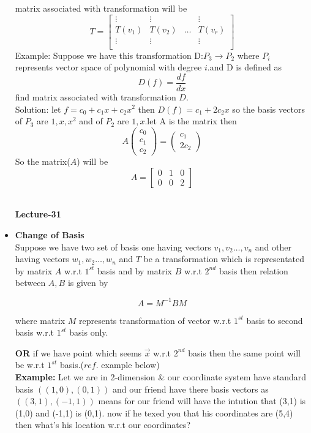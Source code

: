 \documentclass[a4paper,11pt]{article}
\numberwithin{equation}{section}
\begin{document}
\begin{itemize}
matrix associated with transformation will be 
\[T=
\begin{bmatrix}
    \vdots&\vdots&&\vdots\\
    T(v_1)&T(v_2)&\dots&T(v_r)\\
    \vdots&\vdots&&\vdots\\
\end{bmatrix}
\]
Example: Suppose we have this transformation D:$P_3\rightarrow P_2$ where $P_i$ represents vector space of polynomial with degree $i$.and D is defined as \[D(f)=\frac{df}{dx}\] find matrix associated with transformation $D$.\\
Solution: let $f=c_0+c_1x+c_2x^2$ then $D(f)=c_1+2c_2x$ so the basis vectors of $P_3$ are $1,x,x^2$ and of $P_2$ are $1,x$.let A is the matrix then
\[A\begin{pmatrix}
    c_0\\c_1\\c_2
\end{pmatrix}=\begin{pmatrix}
    c_1\\2c_2
\end{pmatrix}\]
So the matrix($A$) will be 
\[A=\begin{bmatrix}
    0&1&0\\0&0&2
\end{bmatrix}\]
\\
\begin{center}
    \Huge{\textbf{Lecture-31}}
\end{center}
\vspace{5pt}

\item \textbf{Change of Basis} \\

Suppose we have two set of basis one having vectors $v_1,v_2\dots,v_n$ and other having vectors $w_1,w_2\dots,w_n$ and $T$ be a transformation which is representated by matrix $A$ w.r.t $1^{st}$ basis and by matrix $B$ w.r.t $2^{nd}$ basis then relation between $A,B$ is given by

\[
\boxed{A=M^{-1}BM}
\]

where matrix $M$ represents transformation of vector w.r.t $1^{st}$ basis to second basis w.r.t $1^{st}$ basis only.

\textbf{OR} if we have point which seems $\boxed{\vec{x}}$ w.r.t $2^{nd}$ basis then the same point will be  w.r.t $1^{st}$ basis.($ref.$ example below)\\

\textbf{Example:} Let we are in 2-dimension \& our coordinate system have standard basis $\left((1,0),(0,1)\right)$ and our friend have there basis vectors as
$\left((3,1),(-1,1)\right)$ means for our friend will have the intution that (3,1) is
(1,0) and (-1,1) is (0,1). now if he texed you that his coordinates are (5,4) then what's his location w.r.t our coordinates?


\end{itemize}
\end{document}

